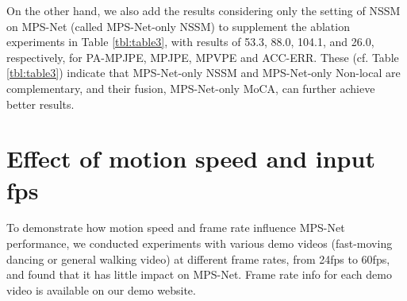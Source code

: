 \documentclass[10pt,twocolumn,letterpaper]{article}
\begin{document}
On the other hand, we also add the results considering only the setting of NSSM on MPS-Net (called MPS-Net-only NSSM) to supplement the ablation experiments in Table \ref{tbl:table3}, with results of 53.3, 88.0, 104.1, and 26.0, respectively, for PA-MPJPE, MPJPE, MPVPE and ACC-ERR. These (cf. Table \ref{tbl:table3}) indicate that MPS-Net-only NSSM and MPS-Net-only Non-local are complementary, and their fusion, \ie MPS-Net-only MoCA, can further achieve better results.

\section{Effect of motion speed and input fps}



To demonstrate how motion speed and frame rate influence MPS-Net performance, we conducted experiments with various demo videos (\eg fast-moving dancing or general walking video) at different frame rates, from 24fps to 60fps, and found that it has little impact on MPS-Net. Frame rate info for each demo video is available on our demo website.
\end{document}
